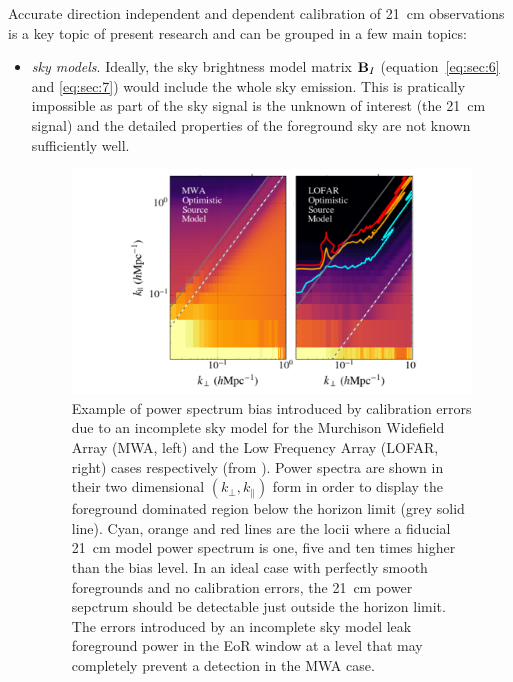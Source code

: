 Accurate direction independent and dependent calibration of 21~cm observations is a key topic of present research and can be grouped in a few main topics: 
%
\begin{itemize}
\item {\it sky models}. Ideally, the sky brightness model matrix ${\bf B}_I$ (equation~\ref{eq:sec:6} and \ref{eq:sec:7}) would include the whole sky emission. This is pratically impossible as part of the sky signal is the unknown of interest (the 21~cm signal) and the detailed properties of the foreground sky are not known sufficiently well. \begin{figure}[]
\begin{center}
\includegraphics[width=1.\textwidth]{Bernardi/calibration_errors}
\end{center}
\caption{Example of power spectrum bias introduced by calibration errors due to an incomplete sky model for the Murchison Widefield Array (MWA, left) and the Low Frequency Array (LOFAR, right) cases respectively (from \cite{ewall-wice17}). Power spectra are shown in their two dimensional $(k_\perp,k_\parallel)$ form in order to display the foreground dominated region below the horizon limit (grey solid line). Cyan, orange and red lines are the locii where a fiducial 21~cm model power spectrum is one, five and ten times higher than the bias level. In an ideal case with perfectly smooth foregrounds and no calibration errors, the 21~cm power sepctrum should be detectable just outside the horizon limit. The errors introduced by an incomplete sky model leak foreground power in the EoR window at a level that may completely prevent a detection in the MWA case.}
\label{fig:fig_added}
\end{figure}

\end{itemize}
